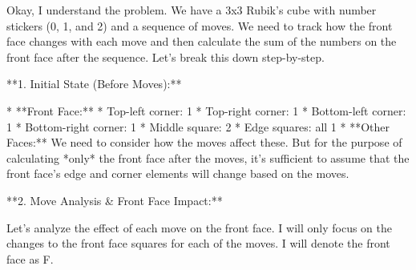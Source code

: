 Okay, I understand the problem. We have a 3x3 Rubik's cube with number stickers (0, 1, and 2) and a sequence of moves. We need to track how the front face changes with each move and then calculate the sum of the numbers on the front face after the sequence. Let's break this down step-by-step.

**1. Initial State (Before Moves):**

*   **Front Face:**
    *   Top-left corner: 1
    *   Top-right corner: 1
    *   Bottom-left corner: 1
    *   Bottom-right corner: 1
    *   Middle square: 2
    *   Edge squares: all 1
*   **Other Faces:**  We need to consider how the moves affect these. But for the purpose of calculating *only* the front face after the moves, it's sufficient to assume that the front face's edge and corner elements will change based on the moves.

**2. Move Analysis & Front Face Impact:**

Let's analyze the effect of each move on the front face. I will only focus on the changes to the front face squares for each of the moves.  I will denote the front face as F.

